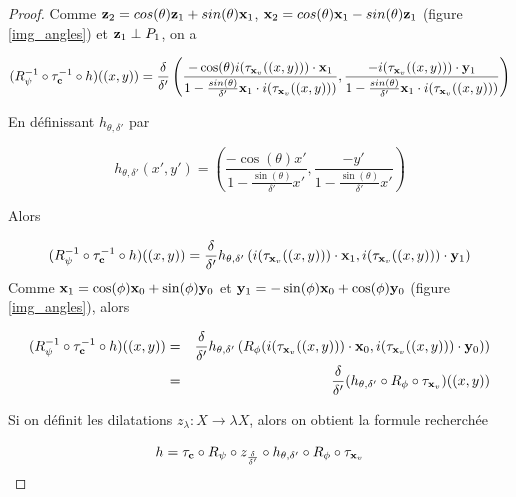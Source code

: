 \begin{proof}
Comme $\mathbf{z}_{2}=cos(\theta)\mathbf{z}_{1}+sin(\theta)\mathbf{x}_{1}$, $\mathbf{x}_{2}=cos(\theta)\mathbf{x}_{1}-sin(\theta)\mathbf{z}_{1}$ (figure \ref{img_angles}) et $\mathbf{z}_{1}\perp P_{1}$, on a

\begin{equation*}
(R_{\psi}^{-1} \circ \tau_{\mathbf{c}}^{-1}  \circ h)((x,y))=\frac{\delta}{\delta'}\left(\frac{-\cos(\theta)i(\tau_{\mathbf{x}_v} ((x,y)))\cdot \mathbf{x}_{1} }{1-\frac{sin(\theta)}{\delta'}\mathbf{x}_{1}\cdot i(\tau_{\mathbf{x}_v}((x,y)))}, \frac{-i(\tau_{\mathbf{x}_v} ((x,y)))\cdot \mathbf{y}_{1}}{1-\frac{sin(\theta)}{\delta'}\mathbf{x}_{1}\cdot i(\tau_{\mathbf{x}_v}((x,y)))}  \right) 
\end{equation*}

En définissant $h_{\theta,\delta'}$ par

\begin{equation*}
h_{\theta,\delta'}(x',y')=\left(\frac{-\cos(\theta)x'}{1-\frac{\sin(\theta)}{\delta'}x'} ,\frac{-y'}{1-\frac{\sin(\theta)}{\delta'}x'}\right)
\end{equation*}

Alors 

\begin{equation*}
(R_{\psi}^{-1} \circ \tau_{\mathbf{c}}^{-1} \circ h)((x,y))= \frac{\delta}{\delta'}h_{\theta,\delta'}\left ( i(\tau_{\mathbf{x}_v}((x,y))) \cdot \mathbf{x}_{1}, i(\tau_{\mathbf{x}_v}((x,y))) \cdot \mathbf{y}_{1}\right)
\end{equation*}
\label{figure_de_rotations_18}
Comme $\mathbf{x}_{1}=\cos(\phi)\mathbf{x}_{0}+\sin(\phi)\mathbf{y}_{0}$ et $\mathbf{y}_{1}=-\sin(\phi)\mathbf{x}_{0}+\cos(\phi)\mathbf{y}_{0}$ (figure \ref{img_angles}), alors

\begin{eqnarray*}
(R_{\psi}^{-1} \circ \tau_{\mathbf{c}}^{-1} \circ h)((x,y)) &=& \frac{\delta}{\delta'}h_{\theta,\delta'}\left ( R_{\phi}(i(\tau_{\mathbf{x}_v}((x,y))) \cdot \mathbf{x}_{0}, i(\tau_{\mathbf{x}_v}((x,y))) \cdot \mathbf{y}_{0})\right)\\
                                               &=&\frac{\delta}{\delta'} (h_{\theta,\delta'}\circ R_{\phi} \circ \tau_{\mathbf{x}_v})((x,y))
\end{eqnarray*}

Si on définit les dilatations $z_{\lambda}:X\rightarrow \lambda X$, alors on obtient la formule recherchée

\begin{equation*}
h = \tau_{\mathbf{c}} \circ R_{\psi} \circ z_{\frac{\delta}{\delta'}} \circ h_{\theta,\delta'} \circ R_{\phi} \circ \tau_{\mathbf{x}_v}
\end{equation*}

\end{proof}


